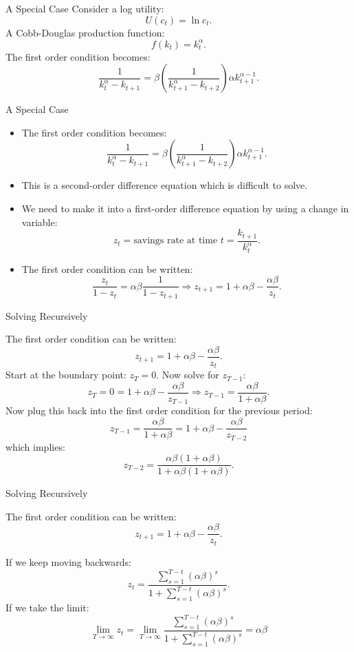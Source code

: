 \documentclass{beamer}
\begin{document}
\begin{frame}{A Special Case}
Consider a log utility:
\[U(c_t)=\ln c_t. 
\]
A Cobb-Douglas production function:
\[f(k_t)=k_t^\alpha.
\]
The first order condition becomes:
\[\frac{1}{k_t^\alpha-k_{t+1}}=\beta \left(\frac{1}{k_{t+1}^\alpha-k_{t+2} } \right) \alpha k_{t+1}^{\alpha-1}.
\]
    
\end{frame}
\begin{frame}{A Special Case}
\begin{itemize}
    \item The first order condition becomes:
\[\frac{1}{k_t^\alpha-k_{t+1}}=\beta \left(\frac{1}{k_{t+1}^\alpha-k_{t+2} } \right) \alpha k_{t+1}^{\alpha-1}.
\]
   \item This is a second-order difference equation which is difficult to solve. 
   \item We need to make it into a first-order difference equation by using a change in variable:
   \[z_t=\text{savings rate at time }t=\frac{k_{t+1}}{k_t^\alpha}.
   \]
   \item The first order condition can be written:
   \[\frac{z_t}{1-z_t}=\alpha \beta \frac{1}{1-z_{t+1}}\Rightarrow z_{t+1}=1+\alpha\beta -\frac{\alpha\beta}{z_t}.
   \]
   
\end{itemize}
    
\end{frame}
\begin{frame}{Solving Recursively}

The first order condition can be written:
   \[ z_{t+1}=1+\alpha\beta -\frac{\alpha\beta}{z_t}.
   \]
Start at the boundary point: $z_T=0$. Now solve for $z_{T-1}$:
\[z_{T}=0=1+\alpha\beta -\frac{\alpha\beta}{z_{T-1}}\Rightarrow z_{T-1}=\frac{\alpha\beta}{1+\alpha \beta}.
\]
Now plug this back into the first order condition for the previous period:
\[ z_{T-1}=\frac{\alpha\beta}{1+\alpha \beta}=1+\alpha\beta -\frac{\alpha\beta}{z_{T-2}}
\]
which implies:
\[z_{T-2}=\frac{\alpha\beta(1+\alpha\beta)}{1+\alpha \beta(1+\alpha\beta)}.
\]\end{frame}
\begin{frame}{Solving Recursively}

The first order condition can be written:
   \[ z_{t+1}=1+\alpha\beta -\frac{\alpha\beta}{z_t}.
   \]
   
  If we keep moving backwards:
  \[z_t=\frac{\sum_{s=1}^{T-t}(\alpha\beta)^s}{1+\sum_{s=1}^{T-t}(\alpha\beta)^s}.
  \]
  If we take the limit:
   \[\lim_{T\to \infty}z_t=\lim_{T\to \infty}\frac{\sum_{s=1}^{T-t}(\alpha\beta)^s}{1+\sum_{s=1}^{T-t}(\alpha\beta)^s}=\alpha\beta
  \]
\end{frame}
\end{document}
